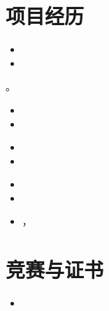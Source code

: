 \documentclass{resume}
\begin{document}
\section{项目经历}


\begin{itemize}[parsep=0.5ex]
  \item 
  \item 
\end{itemize}

。
\begin{itemize}[parsep=0.5ex]
  \item 

  \item 
\end{itemize}




\begin{itemize}[parsep=0.5ex]
  \item 
  \item 
\end{itemize}


\begin{itemize}[parsep=0.5ex]
  \item 

  \item 
  \item ，\\
  
\end{itemize}



\section{竞赛与证书}

\begin{itemize}[parsep=0.5ex]
  \item  


\end{itemize}
\end{document}
